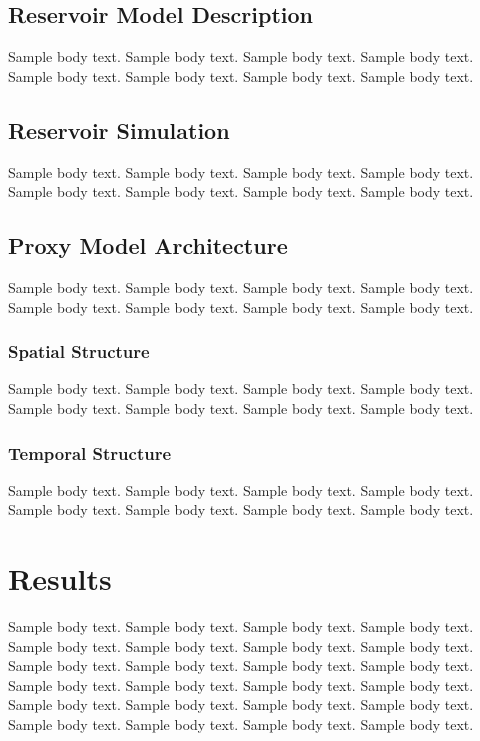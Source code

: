 \documentclass[default,iicol,lineno]{sn-jnl}%
\begin{document}
\subsection{Reservoir Model Description}\label{subsec2_res_model}
Sample body text. Sample body text. Sample body text. Sample body text. Sample body text. Sample body text. Sample body text. Sample body text.

\subsection{Reservoir Simulation}\label{subsec2_res_sim}
Sample body text. Sample body text. Sample body text. Sample body text. Sample body text. Sample body text. Sample body text. Sample body text.

\subsection{Proxy Model Architecture}\label{subsec2_model_architecture}
Sample body text. Sample body text. Sample body text. Sample body text. Sample body text. Sample body text. Sample body text. Sample body text.

\subsubsection{Spatial Structure}\label{subsubsec2_spatial}
Sample body text. Sample body text. Sample body text. Sample body text. Sample body text. Sample body text. Sample body text. Sample body text.

\subsubsection{Temporal Structure}\label{subsubsec2_temporal}
Sample body text. Sample body text. Sample body text. Sample body text. Sample body text. Sample body text. Sample body text. Sample body text.

\section{Results}\label{sec3_results}

Sample body text. Sample body text. Sample body text. Sample body text. Sample body text. Sample body text. Sample body text. Sample body text. Sample body text. Sample body text. Sample body text. Sample body text. Sample body text. Sample body text. Sample body text. Sample body text. Sample body text. Sample body text. Sample body text. Sample body text. Sample body text. Sample body text. Sample body text. Sample body text.
\end{document}

